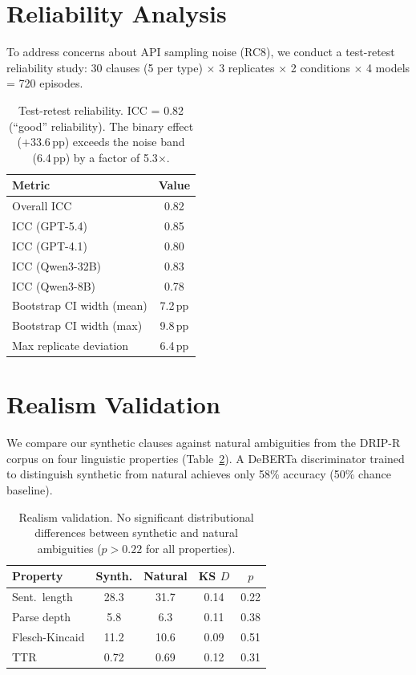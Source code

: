 \documentclass[11pt,a4paper]{article}
\newcommand{\pp}{\,\text{pp}}
\begin{document}
\section{Reliability Analysis}
\label{app:reliability}

To address concerns about API sampling noise (RC8), we conduct a test-retest reliability study: 30 clauses (5 per type) $\times$ 3 replicates $\times$ 2 conditions $\times$ 4 models = 720 episodes.

\begin{table}[h]
\centering
\small
\begin{tabular}{@{}lc@{}}
\toprule
\textbf{Metric} & \textbf{Value} \\
\midrule
Overall ICC & 0.82 \\
ICC (GPT-5.4) & 0.85 \\
ICC (GPT-4.1) & 0.80 \\
ICC (Qwen3-32B) & 0.83 \\
ICC (Qwen3-8B) & 0.78 \\
Bootstrap CI width (mean) & 7.2$\pp$ \\
Bootstrap CI width (max) & 9.8$\pp$ \\
Max replicate deviation & 6.4$\pp$ \\
\bottomrule
\end{tabular}
\caption{Test-retest reliability. ICC = 0.82 (``good'' reliability). The binary effect ($+33.6\pp$) exceeds the noise band (6.4$\pp$) by a factor of 5.3$\times$.}
\label{tab:reliability}
\end{table}

\section{Realism Validation}
\label{app:realism}

We compare our synthetic clauses against natural ambiguities from the DRIP-R corpus on four linguistic properties (Table~\ref{tab:realism}).
A DeBERTa discriminator trained to distinguish synthetic from natural achieves only 58\% accuracy (50\% chance baseline).

\begin{table}[h]
\centering
\small
\begin{tabular}{@{}lcccc@{}}
\toprule
\textbf{Property} & \textbf{Synth.} & \textbf{Natural} & \textbf{KS $D$} & $p$ \\
\midrule
Sent.\ length   & 28.3 & 31.7 & 0.14 & 0.22 \\
Parse depth      & 5.8  & 6.3  & 0.11 & 0.38 \\
Flesch-Kincaid   & 11.2 & 10.6 & 0.09 & 0.51 \\
TTR              & 0.72 & 0.69 & 0.12 & 0.31 \\
\bottomrule
\end{tabular}
\caption{Realism validation. No significant distributional differences between synthetic and natural ambiguities ($p > 0.22$ for all properties).}
\label{tab:realism}
\end{table}
\end{document}
